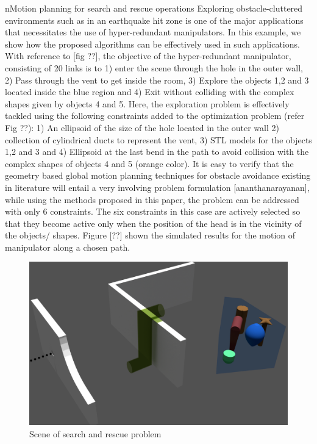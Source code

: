 \documentclass[12pt,a4]{article}
\begin{document}
n{Motion planning for search and rescue operations}
Exploring obstacle-cluttered environments such as in an earthquake hit zone is one of the major applications that necessitates the use of hyper-redundant manipulators. In this example, we show how the proposed algorithms can be effectively used in such applications. With reference to [fig ??], the objective of the hyper-redundant manipulator, consisting of 20 links is to 1) enter the scene through the hole in the outer wall, 2) Pass through the vent to get inside the room, 3) Explore the objects 1,2 and 3 located inside the blue region and 4) Exit without colliding with the complex shapes given by objects 4 and 5. Here, the exploration problem is effectively tackled using the following constraints added to the optimization problem (refer Fig ??): 1) An ellipsoid of the size of the hole located in the outer wall 2) collection of cylindrical ducts to represent the vent, 3) STL models for the objects 1,2 and 3 and 4) Ellipsoid at the last bend in the path to avoid collision with the complex shapes of objects 4 and 5 (orange color). It is easy to verify that the geometry based global motion planning techniques for obstacle avoidance existing in literature will entail a very involving problem formulation [ananthanarayanan], while using the methods proposed in this paper, the problem can be addressed with only 6 constraints. The six constraints in this case are actively selected so that they become active only when the position of the head is in the vicinity of the objects/ shapes. Figure [??] shown the simulated results for the motion of manipulator along a chosen path. 

\begin{figure}[h!]
\centering
\includegraphics[scale=0.2]{figures/figscene.png}
\caption{ Scene of search and rescue problem \label{fig:scene}}
\end{figure}
\end{document}
